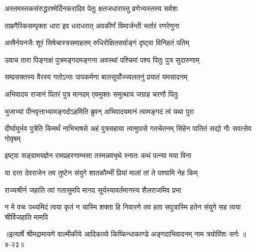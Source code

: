 \twolineshloka
{अस्तमस्तकसंरुद्धरश्मेर्दिनकरादिव}
{पेतुः क्षतजधारास्तु व्रणेभ्यस्तस्य सर्वशः} %

\twolineshloka
{ताम्रगैरिकसम्पृक्ता धारा इव धराधरात्}
{अवकीर्णं विमार्जन्ती भर्तारं रणरेणुना} %

\twolineshloka
{अस्रैर्नयनजैः शूरं सिषेचास्त्रसमाहतम्}
{रुधिरोक्षितसर्वाङ्गं दृष्ट्वा विनिहतं पतिम्} %

\twolineshloka
{उवाच तारा पिङ्गाक्षं पुत्रमङ्गदमङ्गना}
{अवस्थां पश्चिमां पश्य पितुः पुत्र सुदारुणाम्} %

\twolineshloka
{सम्प्रसक्तस्य वैरस्य गतोऽन्तः पापकर्मणा}
{बालसूर्योज्ज्वलतनुं प्रयातं यमसादनम्} %

\twolineshloka
{अभिवादय राजानं पितरं पुत्र मानदम्}
{एवमुक्तः समुत्थाय जग्राह चरणौ पितुः} %

\twolineshloka
{भुजाभ्यां पीनवृत्ताभ्यामङ्गदोऽहमिति ब्रुवन्}
{अभिवादयमानं त्वामङ्गदं त्वं यथा पुरा} %

\threelineshloka
{दीर्घायुर्भव पुत्रेति किमर्थं नाभिभाषसे}
{अहं पुत्रसहाया त्वामुपासे गतचेतनम्}
{सिंहेन पातितं सद्यो गौः सवत्सेव गोवृषम्} %

\twolineshloka
{इष्ट्वा सङ्ग्रामयज्ञेन रामप्रहरणाम्भसा}
{तस्मन्नवभृथे स्नातः कथं पत्न्या मया विना} %

\twolineshloka
{या दत्ता देवराजेन तव तुष्टेन संयुगे}
{शातकौम्भीं प्रियां मालां तां ते पश्यामि नेह किम्} %

\twolineshloka
{राज्यश्रीर्न जहाति त्वां गतासुमपि मानद}
{सूर्यस्यावर्तमानस्य शैलराजमिव प्रभा} %

\twolineshloka
{न मे वचः पथ्यमिदं त्वया कृतं न चास्मि शक्ता हि निवारणे तव}
{हता सपुत्रास्मि हतेन संयुगे सह त्वया श्रीर्विजहाति मामपि} %


॥इत्यार्षे श्रीमद्रामायणे वाल्मीकीये आदिकाव्ये किष्किन्धाकाण्डे अङ्गदाभिवादनम् नाम त्रयोविंशः सर्गः ॥४-२३॥
